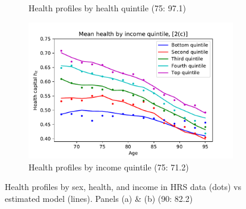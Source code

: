 \documentclass[12pt,pdftex,letterpaper]{article}
\begin{document}
\begin{figure}[h!]
\begin{subfigure}[b]{0.49\textwidth}
        \caption{Health profiles by health quintile (75: 97.1)}
    \end{subfigure}
    \begin{subfigure}[b]{0.49\textwidth}
		\centering
		\includegraphics[width=\textwidth]{../Figures/HealthByIncAge.pdf}
		\caption{Health profiles by income quintile (75: 71.2)}
	\end{subfigure}
    \caption{Health profiles by sex, health, and income in HRS data (dots) vs estimated model (lines). Panels (a) \& (b) (90: 82.2)}
    \label{fig:MomentCat2}
\end{figure}
\end{document}
